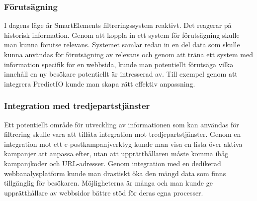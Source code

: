 \subsubsection{Förutsägning}

I dagens läge är SmartElements filtreringssystem reaktivt. Det reagerar på historisk information. Genom att koppla in ett system för förutsägning skulle man kunna förutse relevans. Systemet samlar redan in en del data som skulle kunna användas för förutsägning av relevans och genom att träna ett system med information specifik för en webbsida, kunde man potentiellt förutsäga vilka innehåll en ny besökare potentiellt är intresserad av. Till exempel genom att integrera PredictIO kunde man skapa rätt effektiv anpassning.

\subsubsection{Integration med tredjepartstjänster}

Ett potentiellt område för utveckling av informationen som kan användas för filtrering skulle vara att tillåta integration mot tredjepartstjänster. Genom en integration mot ett e-postkampanjverktyg kunde man visa en lista över aktiva kampanjer att anpassa efter, utan att upprätthållaren måste komma ihåg kampanjkoder och URL-adresser. Genom integration med en dedikerad webbanalysplatform kunde man drastiskt öka den mängd data som finns tillgänglig för besökaren. Möjligheterna är många och man kunde ge upprätthållare av webbsidor bättre stöd för deras egna processer.


